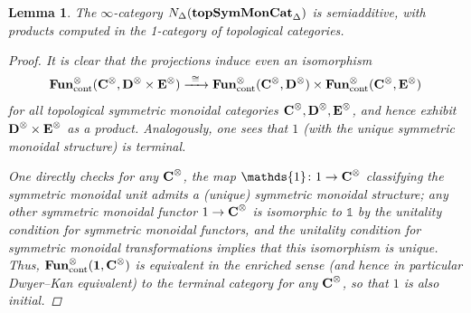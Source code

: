 \documentclass[reqno]{memo-l}
\theoremstyle{mythm}
\newtheorem{lemma}[thm]{Lemma}
\theoremstyle{definition}
\numberwithin{equation}{section}
\newcommand{\bbone}{{\mathds{1}}}
\newcommand{\cat}[1]{\textbf{\textup{#1}}}
\newcommand{\FUN}{\cat{Fun}}
\newcommand{\cont}{\textup{cont}}
\begin{document}
\begin{lemma}
    The $\infty$-category $N_\Delta(\cat{topSymMonCat}_\Delta)$ is semiadditive, with products computed in the 1-category of topological categories.
    \begin{proof}
        It is clear that the projections induce even an isomorphism 
        \[
            \FUN_\cont^\otimes(\cat{C}^\otimes,\cat{D}^\otimes\times\cat{E}^\otimes)\xrightarrow{\;\,\smash{\cong}\,\;}\FUN_\cont^\otimes(\cat{C}^\otimes,\cat{D}^\otimes)\times\FUN_\cont^\otimes(\cat{C}^\otimes,\cat{E}^\otimes)
        \]
        for all topological symmetric monoidal categories $\cat{C}^\otimes,\cat{D}^\otimes,\cat{E}^\otimes$, and hence exhibit $\cat{D}^\otimes\times\cat{E}^\otimes$ as a product. Analogously, one sees that $1$ (with the unique symmetric monoidal structure) is terminal.
    
        One directly checks for any $\cat{C}^\otimes$, the map $\bbone\colon 1\to\cat{C}^\otimes$ classifying the symmetric monoidal unit admits a (unique) symmetric monoidal structure; any other symmetric monoidal functor $1\to\cat{C}^\otimes$ is isomorphic to $\bbone$ by the unitality condition for symmetric monoidal functors, and the unitality condition for symmetric monoidal \emph{transformations} implies that this isomorphism is unique. Thus, $\FUN_\cont^\otimes(\cat{1},\cat{C}^\otimes)$ is equivalent in the enriched sense (and hence in particular Dwyer--Kan equivalent) to the terminal category for any $\cat{C}^\otimes$, so that $1$ is also initial.


\end{proof}
\end{lemma}
\end{document}

